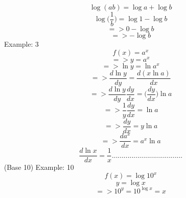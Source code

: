 	\begin{equation}
	\log(ab)=\log a + \log b
	\end{equation}
	\begin{equation}
	\log \bigg(\frac{1}{b}\bigg) = \log 1-\log b
	\end{equation}
	\begin{displaymath}
	=> 0 - \log b
	\end{displaymath}
	\begin{displaymath}
	=> - \log b
	\end{displaymath}
	\newline
	Example: 3
	\begin{displaymath}
	f(x) = a^x
	\end{displaymath}
	\begin{displaymath}
	=> y = a^x
	\end{displaymath}
	\begin{displaymath}
	=> \ln y=\ln a^x
	\end{displaymath}
	\begin{displaymath}
	=> \frac{d\ln y}{dy} = \frac{d(x\ln a)}{dx}
	\end{displaymath}
	\begin{displaymath}
	=>\frac{d\ln y}{dy}\frac{dy}{dx} = \bigg(\frac{dy}{dx}\bigg)\ln a
	\end{displaymath}
	\begin{displaymath}
	=> \frac{1}{y}\frac{dy}{dx} = \ln a
	\end{displaymath}
	\begin{displaymath}
	=> \frac{dy}{dx} = y\ln a
	\end{displaymath}
	\begin{displaymath}
	=>\frac{da^x}{dx} = a^x\ln a 
	\end{displaymath}
	\newline
	\begin{equation}
	\frac{d\ln x}{dx} = \frac{1}{x} ....................................
	\end{equation}
	\newline
	(Base 10)
	\newline
	Example: 10
	\begin{displaymath}
	f(x) = \log10^x
	\end{displaymath}
	\begin{displaymath}
	y = \log x
	\end{displaymath}
	\begin{displaymath}
	=> 10^y = 10^{\log x} = x
	\end{displaymath}
